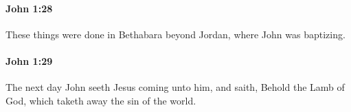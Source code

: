 		\paragraph{John 1:28} %
			\label{JOHN-1-28}

			These things were done in Bethabara beyond Jordan, where John was baptizing.

			\begin{framed}
			\scriptsize
				\begin{compactdesc}
					\item[SBLG] 
				\end{compactdesc}
			\end{framed}

		\paragraph{John 1:29} %
			\label{JOHN-1-29}

			The next day John seeth Jesus coming unto him, and saith, Behold the Lamb of God, which taketh away the sin of the world.

			\begin{framed}
			\scriptsize
				\begin{compactdesc}
					\item[SBLG]  \hyperref[HAMARTIA]{}  \hyperref[KOSMOS]{\grl{κόσμου}}\gr{.}
				\end{compactdesc}
			\end{framed}

